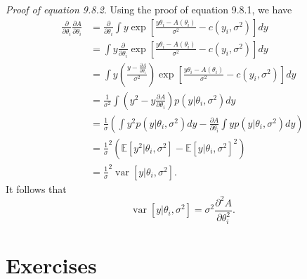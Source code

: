 \documentclass[a4paper,11pt]{article}
\DeclareMathOperator*{\var}{var}
\newcounter{exercise}
\begin{document}
\textit{Proof of equation 9.8.2}.
Using the proof of equation 9.8.1, we have
\begin{align*}
    \frac{ \partial }{ \partial \theta_i }\frac{ \partial A }{ \partial \theta_i }
    &= \frac{ \partial }{ \partial \theta_i }
    \int y \exp\left[
        \frac{ y\theta_i - A( \theta_i )}{ \sigma^2 } - c( y_i, \sigma^2 )
    \right]dy \\
    &= \int y \frac{\partial}{\partial \theta_i} \exp\left[
        \frac{ y\theta_i - A(\theta_i) }{ \sigma^2 } - c( y_i, \sigma^2 )
    \right]dy \\
    &= \int y\left(
		\frac{ y-\frac{ \partial A }{ \partial \theta_i }}{ \sigma^2 }
	\right)\exp\left[
        \frac{ y\theta_i - A(\theta_i) }{ \sigma^2 } - c( y_i, \sigma^2 )
    \right]dy \\
    &= \frac1{ \sigma^2 } \int
    \left(
        y^2 - y\frac{ \partial A }{ \partial \theta_i }
    \right)p( y|\theta_i, \sigma^2 )dy \\
    &= \frac1\sigma \left(
        \int y^2p( y|\theta_i, \sigma^2 )dy
        - \frac{ \partial A }{ \partial \theta_i }
        \int y p( y|\theta_i, \sigma^2 )dy
    \right) \\
    &= \frac1\sigma^2\left(
        \mathbb{E}[ y^2|\theta_i, \sigma^2 ]
		- \mathbb{E}[ y|\theta_i, \sigma^2 ] ^ 2
    \right) \\
    &= \frac1\sigma^2 \var[ y|\theta_i, \sigma^2 ].
\end{align*}
It follows that
\[
    \var[ y|\theta_i, \sigma^2 ]
    = \sigma ^ 2 \frac{ \partial^2A }{ \partial\theta_i^2 }.
\]
\section*{Exercises}

\setcounter{exercise}{1}
\end{document}
